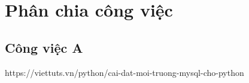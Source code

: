 \documentclass[a4paper, 12pt]{article}
\begin{document}
\newpage
\tableofcontents


\newpage
\section{Phân chia công việc}
\subsection{Công việc A}


\newpage
\begin{thebibliography}{5}
 https://viettuts.vn/python/cai-dat-moi-truong-mysql-cho-python

\end{thebibliography}
\end{document}
